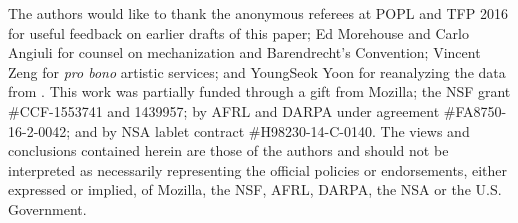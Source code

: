 
The authors would like to thank the anonymous referees at POPL and TFP 2016  for useful feedback on earlier drafts of this paper; Ed Morehouse and Carlo Angiuli for counsel on mechanization and Barendrecht's
Convention; Vincent Zeng for \textit{pro bono} artistic services; and YoungSeok Yoon for reanalyzing the data from \cite{6883030}.
This work was partially funded through a gift from Mozilla; the NSF grant \#CCF-1553741 and 1439957; by AFRL and DARPA under agreement \#FA8750-16-2-0042; and by NSA lablet contract \#H98230-14-C-0140. The views and conclusions contained herein are those of the authors and should not be interpreted as necessarily representing the official policies or endorsements, either expressed or implied, of Mozilla, the NSF, AFRL, DARPA, the NSA or the U.S. Government.
